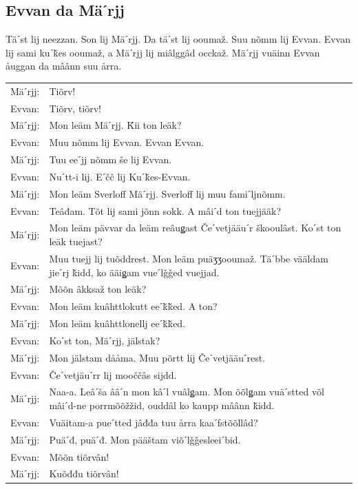 \documentclass{scrbook}
\begin{document}
\subsection*{Evvan da Mäˊrjj}
Täˊst lij neezzan. Son lij Mäˊrjj. Da täˊst lij ooumaž. Suu nõmm lij Evvan. Evvan lij sami kuˊǩes ooumaž, a Mäˊrjj lij miâlggâd occkaž. Mäˊrjj vuäinn Evvan åuggan da mâânn suu årra.\\

\begin{tabularx}{\textwidth}{l X}
Mäˊrjj:&	Tiõrv!\\
Evvan:&	Tiõrv, tiõrv!\\
Mäˊrjj:&	Mon leäm Mäˊrjj. Ǩii ton leäk?\\
Evvan:&	Muu nõmm lij Evvan. Evvan Evvan.\\
Mäˊrjj:&	Tuu eeˊjj nõmm še lij Evvan.\\
Evvan:&	Nuˊtt-i lij. Eˊčč lij Kuˊǩes-Evvan.\\
Mäˊrjj:&	Mon leäm Sverloff Mäˊrjj. Sverloff lij muu famiˊljnõmm.\\
Evvan:&	Teâđam. Tõt lij sami jõnn sokk. A mâiˊd ton tuejjääk?\\
Mäˊrjj:&	Mon leäm pävvar da leäm reâuǥast Čeˊvetjääuˊr škooulâst. Koˊst ton leäk tuejast?\\
Evvan:&	Muu tuejj lij tuõddrest. Mon leäm puäʒʒooumaž. Täˊbbe vääldam jieˊrj ǩidd, ko ääiǥam vueˊlǧǧed vuejjad.\\
Mäˊrjj:&	Mõõn âkksaž ton leäk?\\
Evvan:&	Mon leäm kuâhttlokutt eeˊǩǩed. A ton?\\
Mäˊrjj:&	Mon leäm kuâhttlonellj eeˊǩǩed.\\
Evvan:&	Koˊst ton, Mäˊrjj, jälstak?\\
Mäˊrjj:&	Mon jälstam dååma. Muu põrtt lij Čeˊvetjääuˊrest.\\
Evvan:&	Čeˊvetjäuˊrr lij mooččâs sijdd.\\
Mäˊrjj:&	Naa-a. Leâˊša ââˊn mon kâˊl vuâlǥam. Mon õõlǥam vuäˊstted võl mâiˊd-ne porrmõõžžid, ouddâl ko kaupp mâânn ǩidd.\\
Evvan:&	Vuäitam-a pueˊtted jâđđa tuu årra kaaˊfstõõllâd?\\
Mäˊrjj:&	Puäˊđ, puäˊđ. Mon pääštam viõˊlǧǧesleeiˊbid.\\
Evvan:&	Mõõn tiõrvân!\\
Mäˊrjj:&	Kuõđđu tiõrvân!\\
\end{tabularx}
\end{document}
